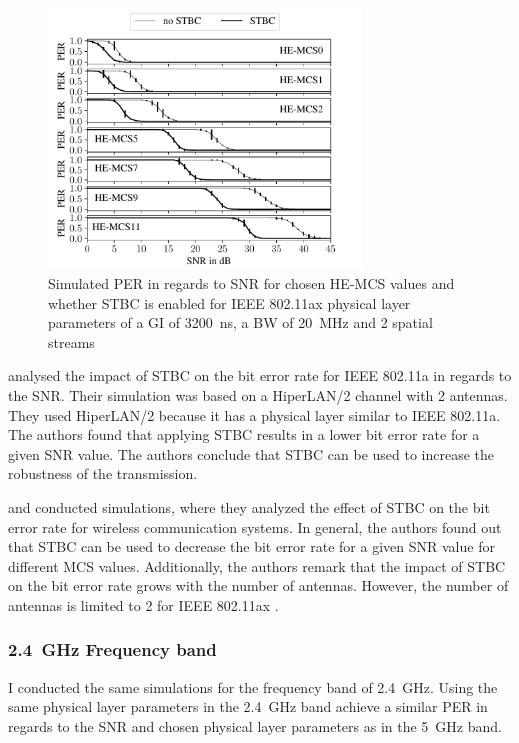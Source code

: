 \begin{figure}%
   \centering
   \includegraphics[width=0.74\textwidth]{figures/STBC_PER_to_SNR.pdf}
   \caption{Simulated \ac{PER} in regards to \ac{SNR} for chosen \ac{HE}-\ac{MCS} values and whether \ac{STBC} is enabled for IEEE 802.11ax physical layer parameters of a \ac{GI} of \SI{3200}{\nano\second}, a \ac{BW} of \SI{20}{\mega\hertz} and 2 spatial streams}%
   \label{fig:PER_SNR_STBC}%
\end{figure}
\textcite{stamoulis_impact_2003} analysed the impact of \ac{STBC} on the bit error rate for IEEE 802.11a in regards to the \ac{SNR}. Their simulation was based
on a HiperLAN/2 channel with \num{2} antennas. They used HiperLAN/2 because it has a physical layer similar to IEEE 802.11a.
The authors found that applying \ac{STBC} results in a lower bit error rate for a given \ac{SNR} value. The authors conclude that \ac{STBC} can be used to increase the
robustness of the transmission.

\textcite{santumon_space-time_2012} and \textcite{tarokh_space-time_1999} conducted simulations, where they analyzed the effect of \ac{STBC} on the bit error rate for
wireless communication systems. In general, the authors found out that \ac{STBC} can be used to decrease the bit error rate for a given \ac{SNR} value for different
\ac{MCS} values. Additionally, the authors remark that the impact of \ac{STBC} on the bit error rate grows with the number of antennas.
However, the number of antennas is limited to \num{2} for IEEE 802.11ax \cite{ieee_standard_2021ax}.

\subsubsection*{\SI{2.4}{\giga\hertz} Frequency band}
I conducted the same simulations for the frequency band of \SI{2.4}{\giga\hertz}. Using the same physical layer parameters in
the \SI{2.4}{\giga\hertz} band achieve a similar \ac{PER} in regards to the \ac{SNR} and chosen physical layer parameters
as in the \SI{5}{\giga\hertz} band.

